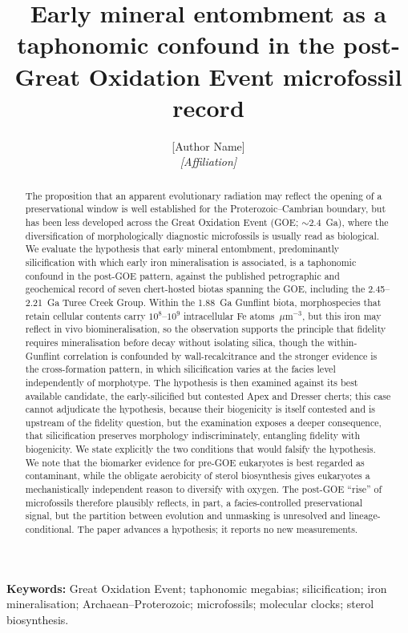 \documentclass[11pt]{article}
\title{\vspace{-1.0cm}\textbf{Early mineral entombment as a taphonomic confound in the
post-Great Oxidation Event microfossil record}}
\author{[Author Name]\\
\small\textit{[Affiliation]}}
\date{}
\begin{document}
\maketitle

\begin{abstract}
\noindent The proposition that an apparent evolutionary radiation may reflect the opening of a
preservational window is well established for the Proterozoic--Cambrian boundary, but has been less
developed across the Great Oxidation Event (GOE; $\sim$2.4~Ga), where the diversification of
morphologically diagnostic microfossils is usually read as biological. We evaluate the hypothesis
that early mineral entombment, predominantly silicification with which early iron mineralisation is
associated, is a taphonomic confound in the post-GOE pattern, against the published petrographic and
geochemical record of seven chert-hosted biotas spanning the GOE, including the 2.45--2.21~Ga Turee
Creek Group. Within the 1.88~Ga Gunflint biota, morphospecies that retain cellular contents carry
$10^{8}$--$10^{9}$ intracellular Fe atoms~$\mu$m$^{-3}$, but this iron may reflect in vivo
biomineralisation, so the observation supports the principle that fidelity requires mineralisation
before decay without isolating silica, though the within-Gunflint correlation is confounded by
wall-recalcitrance and the stronger evidence is the cross-formation pattern, in which silicification
varies at the facies level independently of morphotype. The hypothesis is then examined against its
best available candidate, the early-silicified but contested Apex and Dresser cherts; this case
cannot adjudicate the hypothesis, because their biogenicity is itself contested and is upstream of
the fidelity question, but the examination exposes a deeper consequence, that silicification
preserves morphology indiscriminately, entangling fidelity with biogenicity. We state explicitly
the two conditions that would falsify the hypothesis. We note that the biomarker evidence for pre-GOE eukaryotes is best regarded as
contaminant, while the obligate aerobicity of sterol biosynthesis gives eukaryotes a
mechanistically independent reason to diversify with oxygen. The post-GOE ``rise'' of microfossils
therefore plausibly reflects, in part, a facies-controlled preservational signal, but the partition
between evolution and unmasking is unresolved and lineage-conditional. The paper advances a
hypothesis; it reports no new measurements.
\end{abstract}

\noindent\textbf{Keywords:} Great Oxidation Event; taphonomic megabias; silicification; iron
mineralisation; Archaean--Proterozoic; microfossils; molecular clocks; sterol biosynthesis.
\end{document}
